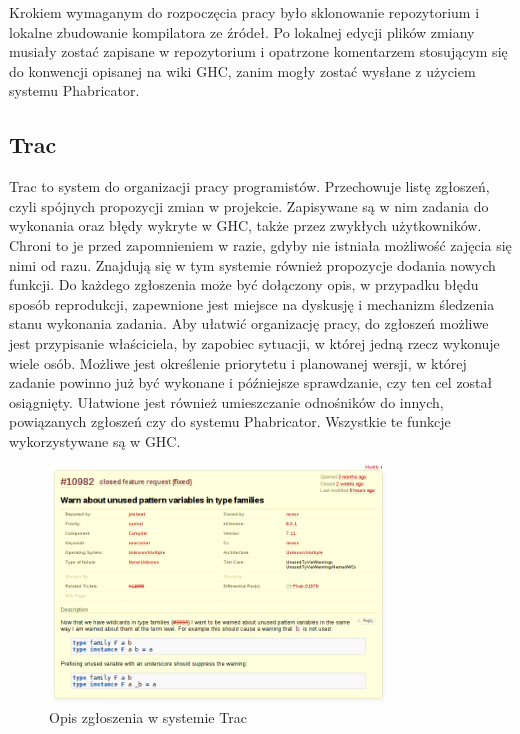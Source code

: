 Krokiem wymaganym do rozpoczęcia pracy było sklonowanie repozytorium i lokalne zbudowanie kompilatora ze źródeł. Po lokalnej edycji plików zmiany musiały zostać zapisane w repozytorium i opatrzone komentarzem stosującym się do konwencji opisanej na wiki GHC, zanim mogły zostać wysłane z użyciem systemu Phabricator.

\subsection{Trac}

Trac to system do organizacji pracy programistów. Przechowuje listę zgłoszeń, czyli spójnych propozycji zmian w projekcie. Zapisywane są w nim zadania do wykonania oraz błędy wykryte w GHC, także przez zwykłych użytkowników. Chroni to je przed zapomnieniem w razie, gdyby nie istniała możliwość zajęcia się nimi od razu. Znajdują się w tym systemie również propozycje dodania nowych funkcji. Do każdego zgłoszenia może być dołączony opis, w przypadku błędu sposób reprodukcji, zapewnione jest miejsce na dyskusję i mechanizm śledzenia stanu wykonania zadania. Aby ułatwić organizację pracy, do zgłoszeń możliwe jest przypisanie właściciela, by zapobiec sytuacji, w której jedną rzecz wykonuje wiele osób. Możliwe jest określenie priorytetu i planowanej wersji, w której zadanie powinno już być wykonane i późniejsze sprawdzanie, czy ten cel został osiągnięty. Ułatwione jest również umieszczanie odnośników do innych, powiązanych zgłoszeń czy do systemu Phabricator. Wszystkie te funkcje wykorzystywane są w GHC.

\begin{figure}[ht]
    \centering
    \includegraphics[width=0.8\textwidth]{images/Trac_description}
    \caption{Opis zgłoszenia w systemie Trac}
    \label{fig:Trac_description}
\end{figure}

